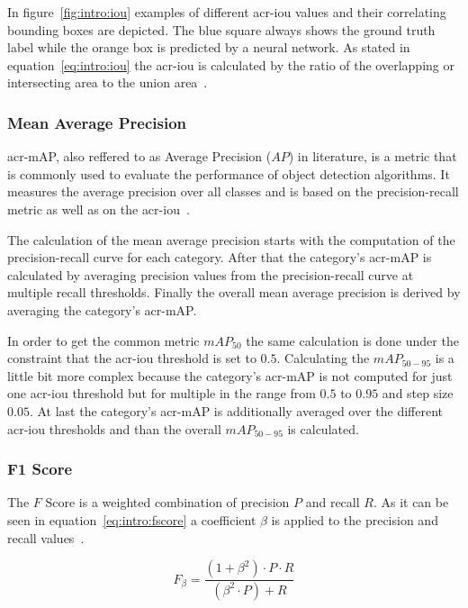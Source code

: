 In figure~\ref{fig:intro:iou} examples of different \gls{acr-iou} values and their correlating bounding 
boxes are depicted. The blue square always shows the ground truth label while the orange box is 
predicted by a neural network. As stated in equation~\ref{eq:intro:iou} the \gls{acr-iou} is calculated 
by the ratio of the overlapping or intersecting area to the union area~\cite{terven2023}.

\subsubsection*{Mean Average Precision}

\gls{acr-mAP}, also reffered to as Average Precision ($AP$) in literature, is a metric that is commonly 
used to evaluate the performance of object detection algorithms. It measures the average precision 
over all classes and is based on the precision-recall metric as well as on the
\gls{acr-iou}~\cite{terven2023}.

The calculation of the mean average precision starts with the computation of the precision-recall 
curve for each category. After that the category's \gls{acr-mAP} is calculated by averaging precision 
values from the precision-recall curve at multiple recall thresholds. Finally the overall mean average 
precision is derived by averaging the category's \gls{acr-mAP}. 

In order to get the common metric $mAP_{50}$ the same calculation is done under the 
constraint that the \gls{acr-iou} threshold is set to $0.5$. Calculating the $mAP_{50-95}$ is a 
little bit more complex because the category's \gls{acr-mAP} is not computed for just one 
\gls{acr-iou} threshold but for multiple in the range from $0.5$ to $0.95$ and step size $0.05$. At 
last the category's \gls{acr-mAP} is additionally averaged over the different \gls{acr-iou} thresholds 
and than the overall $mAP_{50-95}$ is calculated.

\subsubsection*{F1 Score}

The $F$ Score is a weighted combination of precision $P$ and recall $R$. As it can be seen in 
equation~\ref{eq:intro:fscore} a coefficient $\beta$ is applied to the precision and recall 
values~\cite{chaar2005, goutte2005, skopal2005}. 

\begin{equation}
	\label{eq:intro:fscore}
	F_\beta = \frac{(1 + \beta^2) \cdot P \cdot R}{(\beta^2 \cdot P) + R}
\end{equation} 

